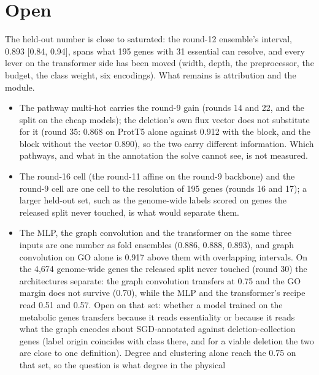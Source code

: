 
\section{Open}
\label{sec:open}

The held-out number is close to saturated: the round-12 ensemble's interval, 0.893
[0.84, 0.94], spans what 195 genes with 31 essential can resolve, and every lever on the
transformer side has been moved (width, depth, the preprocessor, the budget, the class
weight, six encodings). What remains is attribution and the module.

\begin{itemize}
  \item The pathway multi-hot carries the round-9 gain (rounds 14 and 22, and the split
    on the cheap models); the deletion's own flux vector does not substitute for it
    (round 35: 0.868 on ProtT5 alone against 0.912 with the block, and the block
    without the vector 0.890), so the two carry different information. Which
    pathways, and what in the annotation the solve cannot see, is not measured.
  \item The round-16 cell (the round-11 affine on the round-9 backbone) and the round-9
    cell are one cell to the resolution of 195 genes (rounds 16 and 17); a larger
    held-out set, such as the genome-wide labels scored on genes the released split
    never touched, is what would separate them.
  \item The MLP, the graph convolution and the transformer on the same three inputs are
    one number as fold ensembles (0.886, 0.888, 0.893), and graph convolution on GO
    alone is 0.917 above them with overlapping intervals. On the 4,674 genome-wide
    genes the released split never touched (round 30) the architectures separate:
    the graph convolution transfers at 0.75 and the GO margin does not survive
    (0.70), while the MLP and the transformer's recipe read 0.51 and 0.57. Open on
    that set: whether a model trained on the metabolic genes transfers because it
    reads essentiality or because it reads what the graph encodes about SGD-annotated
    against deletion-collection genes (label origin coincides with class there, and
    for a viable deletion the two are close to one definition). Degree and clustering
    alone reach the 0.75 on that set, so the question is what degree in the physical

\end{itemize}
